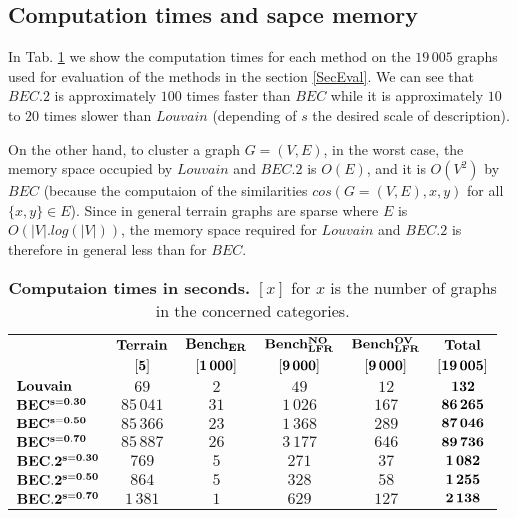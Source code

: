 \documentclass[12pt]{article}
\theoremstyle{thmstyleone}%
\theoremstyle{definition}
\begin{document}
\subsection{Computation times and sapce memory  \label{Calculation_times}}

In Tab. \ref{TC} we show the computation times for each method on the $19\,005$ graphs used for evaluation of the methods
in the section \ref{SecEval}.
We can see that $BEC.2$ is approximately $100$ times faster than $BEC$ while it is approximately $10$ to $20$ times slower than $Louvain$ (depending of $s$ the desired scale of description).

On the other hand, to cluster a graph $G=(V,E)$, in the worst case, the memory space occupied by $Louvain$ and $BEC.2$ is $O(E)$, and it is $O(V^2)$ by $BEC$ (because the computaion of the similarities $cos(G=(V,E), x, y)$ for all $\{x,y\} \in E$). Since in general terrain graphs are sparse where $E$ is $O(|V|.log(|V|))$, the memory space required for $Louvain$ and $BEC.2$ is therefore in general less than for $BEC$.

\begin{table}[!ht]
\footnotesize
\centering
\begin{tabular}{|l | c | c  | c  | c | c |  }
\hline
  &{\bf $\bf Terrain$} & {\bf $\bf Bench_{ER}$} & {\bf $\bf Bench_{LFR}^{NO}$} & {\bf $\bf Bench_{LFR}^{OV}$} & {\bf $\bf Total$} \\
  &{\bf $\bf [5]$} & {\bf $\bf [1\,000]$} & {\bf $\bf [9\,000]$} & {\bf $\bf [9\,000]$} & {\bf $\bf [19\,005]$} \\
\hline
\hline
\color{red}         {\bf $\bf Louvain$}& \color{red} $69$        & \color{red} $2$  & \color{red} $49$     & \color{red} $12$  & \color{red} $\bf 132$ \\
\hline
\hline
  {\bf $\bf BEC^{s=0.30}$}& $85\,041$   & $31$ & $1\,026$ & $167$ & $\bf 86\,265$ \\
\hline
  {\bf $\bf BEC^{s=0.50}$}& $85\,366$   & $23$ & $1\,368$ & $289$ & $\bf 87\,046$ \\
\hline
  {\bf $\bf BEC^{s=0.70}$}& $85\,887$   & $26$ & $3\,177$ & $646$ & $\bf 89\,736$ \\
\hline
\hline
  {\bf $\bf BEC.2^{s=0.30}$}& $769$       & $5$  & $271$    & $37$  & $\bf 1\,082$ \\
\hline
  {\bf $\bf BEC.2^{s=0.50}$}& $864$       & $5$  & $328$    & $58$ & $\bf 1\,255$ \\
\hline
  {\bf $\bf BEC.2^{s=0.70}$}& $1\,381$    & $1$  & $629$    & $127$ & $\bf 2\,138$ \\
\hline
\end{tabular}
\bigskip
    \caption{{\bf Computaion times in seconds.} $[x]$ for $x$ is the number of graphs in the concerned categories.
    \label{TC}}
\end{table}
\normalsize
\end{document}

